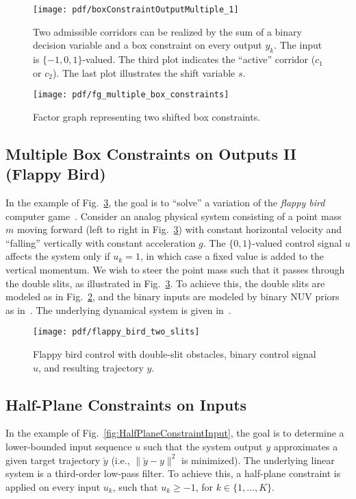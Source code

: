 \documentclass[conference]{IEEEtran}
\begin{document}
\begin{figure}
\texttt{[image: pdf/boxConstraintOutputMultiple\_1]}
\caption{Two admissible corridors can be realized by the sum of a binary
decision variable and a box constraint on every output $y_k$. 
The input is $\{-1,0,1\}$-valued. The third plot indicates the ``active'' corridor ($c_1$ or $c_2$).
The last plot illustrates the shift variable $s$. }
\label{fig:boxConstraintOutputMultiple_1}
\end{figure}

\begin{figure}
\centering
\texttt{[image: pdf/fg\_multiple\_box\_constraints]}
\caption{Factor graph representing two shifted box constraints.}
\label{fig:fg_multiple_box_constraints}
\end{figure}




\subsection{Multiple Box Constraints on Outputs II (Flappy Bird)}
In the example of Fig.~\ref{fig:flappy_bird_two_slits}, 
the goal is to ``solve'' a variation of the \emph{flappy bird} 
computer game~\cite{wiki_flappy_bird}.
Consider an analog physical system consisting 
of a point mass $m$ moving forward (left to right in 
Fig.~\ref{fig:flappy_bird_two_slits}) 
with constant horizontal velocity
and ``falling'' vertically with constant acceleration $g$. 
The $\{0,1\}$-valued control signal $u$ affects the system only if $u_k=1$,
in which case a fixed value is added to the vertical momentum.
We wish to steer the point mass such that it passes 
through the double slits, as illustrated in 
Fig.~\ref{fig:flappy_bird_two_slits}. 
To achieve this, the double slits are modeled as in 
Fig.~\ref{fig:fg_multiple_box_constraints}, and the binary 
inputs are modeled by binary NUV priors as in~\cite{keusch2021binaryNUV}.
The underlying dynamical system is given in~\cite[Section~4.2]{keusch2021binaryNUV}.

\begin{figure}
\centering
\texttt{[image: pdf/flappy\_bird\_two\_slits]}
\caption{Flappy bird control with double-slit obstacles, binary control signal $u$, and resulting trajectory $y$.}
\label{fig:flappy_bird_two_slits}
\end{figure}




\subsection{Half-Plane Constraints on Inputs}
In the example of Fig.~\ref{fig:HalfPlaneConstraintInput}, 
the goal is to determine a lower-bounded input sequence $u$ 
such that the system output $y$ approximates a
given target trajectory $\breve y$ (i.e., $\|\breve y - y\|^2$ is minimized).
The underlying linear system is a
third-order low-pass filter. To achieve this, 
a half-plane constraint is applied on every input
$u_k$, such that $u_k \geq -1$, for $k \in \{1, \dots, K\}$.
\end{document}
